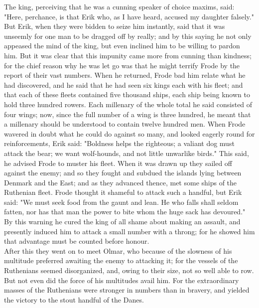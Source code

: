 \documentclass[10pt,a4paper]{report}
\begin{document}
The king, perceiving that he was a cunning speaker of choice maxims, said: "Here, perchance, is that Erik who, as I have heard, accused my daughter falsely."\\

But Erik, when they were bidden to seize him instantly, said that it was unseemly for one man to be dragged off by really; and by this saying he not only appeased the mind of the king, but even inclined him to be willing to pardon him. But it was clear that this impunity came more from cunning than kindness; for the chief reason why he was let go was that he might terrify Frode by the report of their vast numbers. When he returned, Frode bad him relate what he had discovered, and he said that he had seen six kings each with his fleet; and that each of these fleets contained five thousand ships, each ship being known to hold three hundred rowers. Each millenary of the whole total he said consisted of four wings; now, since the full number of a wing is three hundred, he meant that a millenary should be understood to contain twelve hundred men. When Frode wavered in doubt what he could do against so many, and looked eagerly round for reinforcements, Erik said: "Boldness helps the righteous; a valiant dog must attack the bear; we want wolf-hounds, and not little unwarlike birds." This said, he advised Frode to muster his fleet. When it was drawn up they sailed off against the enemy; and so they fought and subdued the islands lying between Denmark and the East; and as they advanced thence, met some ships of the Ruthenian fleet. Frode thought it shameful to attack such a handful, but Erik said: "We must seek food from the gaunt and lean. He who falls shall seldom fatten, nor has that man the power to bite whom the huge sack has devoured." By this warning he cured the king of all shame about making an assault, and presently induced him to attack a small number with a throng; for he showed him that advantage must be counted before honour.\\

After this they went on to meet Olmar, who because of the slowness of his multitude preferred awaiting the enemy to attacking it; for the vessels of the Ruthenians seemed disorganized, and, owing to their size, not so well able to row. But not even did the force of his multitudes avail him. For the extraordinary masses of the Ruthenians were stronger in numbers than in bravery, and yielded the victory to the stout handful of the Danes.\\
\end{document}
